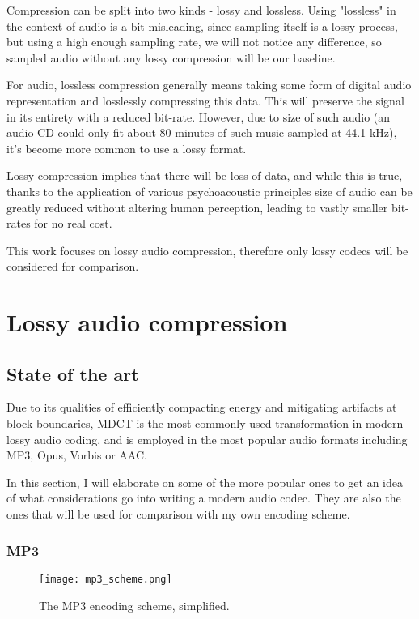 Compression can be split into two kinds - lossy and lossless. Using "lossless" in the context of audio is a bit misleading, since sampling itself is a lossy process, but using a high enough sampling rate, we will not notice any difference, so sampled audio without any lossy compression will be our baseline.

For audio, lossless compression generally means taking some form of digital audio representation and losslessly compressing this data. This will preserve the signal in its entirety with a reduced bit-rate. However, due to size of such audio (an audio CD could only fit about 80 minutes of such music sampled at 44.1 kHz), it's become more common to use a lossy format.

Lossy compression implies that there will be loss of data, and while this is true, thanks to the application of various psychoacoustic principles size of audio can be greatly reduced without altering human perception, leading to vastly smaller bit-rates for no real cost.

This work focuses on lossy audio compression, therefore only lossy codecs will be considered for comparison.

\section{Lossy audio compression}
\subsection{State of the art}
\label{sec:stateoftheart}
Due to its qualities of efficiently compacting energy and mitigating artifacts at block boundaries, MDCT is the most commonly used transformation in modern lossy audio coding, and is employed in the most popular audio formats including MP3, Opus, Vorbis or AAC.

In this section, I will elaborate on some of the more popular ones to get an idea of what considerations go into writing a modern audio codec. They are also the ones that will be used for comparison with my own encoding scheme.

\subsubsection{MP3}
\label{sec:mp3}
\begin{figure}[ht]
	\caption[MP3 encoding scheme]{The MP3 encoding scheme, simplified.}
	\label{fig:mp3_scheme}
	\centering
	\texttt{[image: mp3\_scheme.png]}
\end{figure}

